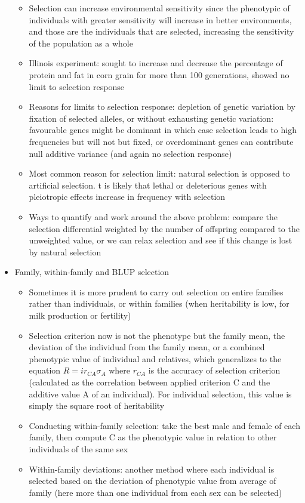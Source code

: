 \documentclass[12pt]{amsart}
\begin{document}
\begin{itemize}
\begin{itemize}
\item Selection can increase environmental sensitivity since the phenotypic of individuals with greater sensitivity will increase in better environments, and those are the individuals that are selected, increasing the sensitivity of the population as a whole
\item Illinois experiment: sought to increase and decrease the percentage of protein and fat in corn grain for more than 100 generations, showed no limit to selection response
\item Reasons for limits to selection response: depletion of genetic variation by fixation of selected alleles, or without exhausting genetic variation: favourable genes might be dominant in which case selection leads to high frequencies but will not but fixed, or overdominant genes can contribute null additive variance (and again no selection response)
\item Most common reason for selection limit: natural selection is opposed to artificial selection. t is likely that lethal or deleterious genes with pleiotropic effects increase in frequency with selection 
\item Ways to quantify and work around the above problem: compare the selection differential weighted by the number of offspring compared to the unweighted value, or we can relax selection and see if this change is lost by natural selection 
\end{itemize}
\item Family, within-family and BLUP selection
\begin{itemize}
\item Sometimes it is more prudent to carry out selection on entire families rather than individuals, or within families (when heritability is low, for milk production or fertility)
\item Selection criterion now is not the phenotype but the family mean, the deviation of the individual from the family mean, or a combined phenotypic value of individual and relatives, which generalizes to the equation $R = ir_{CA}\sigma_A$ where $r_{CA}$ is the accuracy of selection criterion (calculated as the correlation between applied criterion C and the additive value A of an individual). For individual selection, this value is simply the square root of heritability
\item Conducting within-family selection: take the best male and female of each family, then compute C as the phenotypic value in relation to other individuals of the same sex
\item Within-family deviations: another method where each individual is selected based on the deviation of phenotypic value from average of family (here more than one individual from each sex can be selected)

\end{itemize}
\end{itemize}
\end{document}
